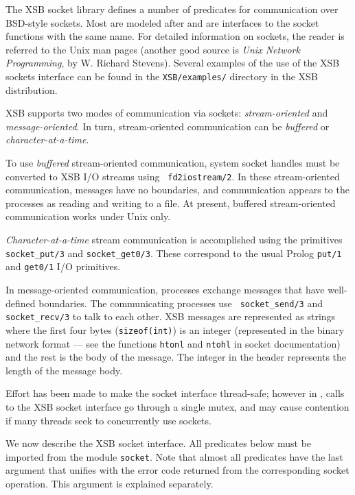 The XSB socket library defines a number of predicates for
communication over BSD-style sockets. Most are modeled after and are
interfaces to the socket functions with the same name. For detailed
information on sockets, the reader is referred to the Unix man pages
(another good source is \emph{Unix Network Programming}, by W.
Richard Stevens).  Several examples of the use of the XSB sockets
interface can be found in the {\tt XSB/examples/} directory in the XSB
distribution.

XSB supports two modes of communication via sockets:
\emph{stream-oriented} and \emph{message-oriented}. In turn,
stream-oriented communication can be \emph{buffered} or
\emph{character-at-a-time}.

To use \emph{buffered} stream-oriented communication, system socket
handles must be converted to XSB I/O streams using {\tt
  fd2iostream/2}.  In these stream-oriented communication, messages
have no boundaries, and communication appears to the processes as
reading and writing to a file.  At present, buffered stream-oriented
communication works under Unix only.

\emph{Character-at-a-time} stream communication is accomplished using
the primitives {\tt socket\_put/3} and {\tt socket\_get0/3}. These
correspond to the usual Prolog {\tt put/1} and {\tt get0/1} I/O primitives.

In message-oriented communication, processes exchange messages that have
well-defined boundaries. The communicating processes use {\tt
  socket\_send/3} and {\tt socket\_recv/3} to talk to each other.
XSB messages are represented as strings where the first four bytes
({\tt sizeof(int)}) is an integer (represented in the binary network format
--- see the functions {\tt htonl} and {\tt ntohl} in socket documentation)
and the rest is the body of the message. The integer in the header
represents the length of the message body.

Effort has been made to make the socket interface thread-safe; however
in \version, calls to the XSB socket interface go through a single
mutex, and may cause contention if many threads seek to concurrently
use sockets.

We now describe the XSB socket interface.  All predicates below must be
imported from the module {\tt socket}. Note that almost all predicates have
the last argument that unifies with the error code returned from the
corresponding socket operation. This argument is explained separately.

